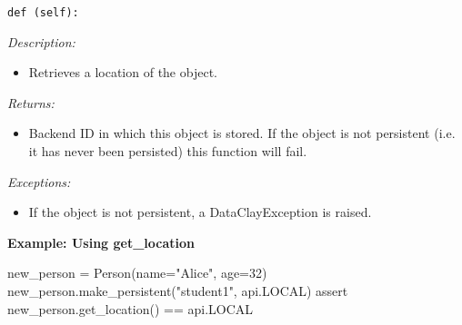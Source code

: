 \begin{dBox}
\texttt{def (self):}
\LINE

{\it Description:}

\begin{itemize}
    \item Retrieves a location of the object. %
\end{itemize}
 
{\it Returns:}

\begin{itemize}
    \item Backend ID in which this object is stored. If the object is not persistent (i.e. it has never been persisted) this function will fail.
\end{itemize}

{\it Exceptions:}

\begin{itemize}
    \item If the object is not persistent, a DataClayException is raised.
\end{itemize}

\end{dBox}

\begin{tBox}
\textcolor{basecolor} {\bf Example: Using get\_location}
\begin{python}
new_person = Person(name="Alice", age=32)
new_person.make_persistent("student1", api.LOCAL)
assert new_person.get_location() == api.LOCAL
\end{python}
\end{tBox}



